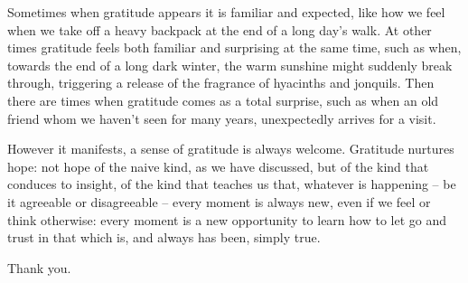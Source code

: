 Sometimes when gratitude appears it is familiar and expected, like how
we feel when we take off a heavy backpack at the end of a long day's
walk. At other times gratitude feels both familiar and surprising at the
same time, such as when, towards the end of a long dark winter, the warm
sunshine might suddenly break through, triggering a release of the fragrance
of hyacinths and jonquils. Then there are times when gratitude comes as
a total surprise, such as when an old friend whom we haven't seen for
many years, unexpectedly arrives for a visit.

However it manifests, a sense of gratitude is always welcome. Gratitude
nurtures hope: not hope of the naive kind, as we have discussed, but of
the kind that conduces to insight, of the kind that teaches us that,
whatever is happening -- be it agreeable or disagreeable -- every moment
is always new, even if we feel or think otherwise: every moment is a new
opportunity to learn how to let go and trust in that which is, and
always has been, simply true.

Thank you.


